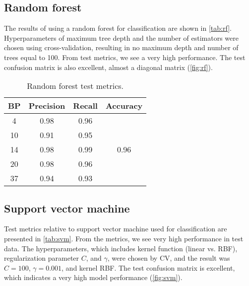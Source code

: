     \subsection{Random forest}

        The results of using a random forest for classification are shown in \autoref{tab:rf}. Hyperparameters of maximum tree depth and the number of estimators were chosen using cross-validation, resulting in no maximum depth and number of trees equal to 100. From test metrics, we see a very high performance. The test confusion matrix is also excellent, almost a diagonal matrix (\autoref{fig:rf}).
        
        \begin{table}[H]
                \centering
                \caption{Random forest test metrics.}
                \label{tab:rf}
                \begin{tabular}{c|cc|c}
                BP & Precision & Recall & Accuracy              \\ \hline
                4  & 0.98      & 0.96   & \multirow{5}{*}{0.96} \\
                10 & 0.91      & 0.95   &                       \\
                14 & 0.98      & 0.99   &                       \\
                20 & 0.98      & 0.96   &                       \\
                37 & 0.94      & 0.93   &                      
                \end{tabular}
        \end{table}

    \subsection{Support vector machine}

        Test metrics relative to support vector machine used for classification are presented in \autoref{tab:svm}. From the metrics, we see very high performance in test data. The hyperparameters, which includes kernel function (linear vs. RBF), regularization parameter $C$, and $\gamma$, were chosen by CV, and the result was $C = 100$, $\gamma = 0.001$, and kernel RBF. The test confusion matrix is excellent, which indicates a very high model performance (\autoref{fig:svm}).
        

